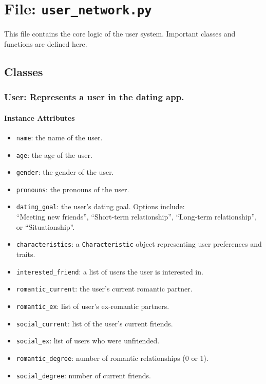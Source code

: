 \documentclass[fontsize=11pt]{article}
\begin{document}
\section*{File: \texttt{user\_network.py}}

This file contains the core logic of the user system. Important classes and functions are defined here.

\subsection*{Classes}

\subsubsection*{User: Represents a user in the dating app.}

\paragraph{Instance Attributes}
\begin{itemize}
    \item \texttt{name}: the name of the user.
    \item \texttt{age}: the age of the user.
    \item \texttt{gender}: the gender of the user.
    \item \texttt{pronouns}: the pronouns of the user.
    \item \texttt{dating\_goal}: the user's dating goal. Options include: \\
    ``Meeting new friends'', ``Short-term relationship'', ``Long-term relationship'', or ``Situationship''.
    \item \texttt{characteristics}: a \texttt{Characteristic} object representing user preferences and traits.
    \item \texttt{interested\_friend}: a list of users the user is interested in.
    \item \texttt{romantic\_current}: the user's current romantic partner.
    \item \texttt{romantic\_ex}: list of user's ex-romantic partners.
    \item \texttt{social\_current}: list of the user's current friends.
    \item \texttt{social\_ex}: list of users who were unfriended.
    \item \texttt{romantic\_degree}: number of romantic relationships (0 or 1).
    \item \texttt{social\_degree}: number of current friends.
\end{itemize}
\end{document}
